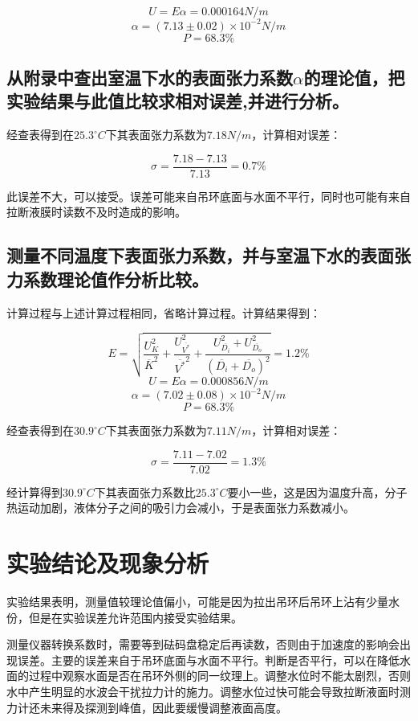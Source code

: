 \documentclass{ctexart}
\begin{document}
$$ U = E \alpha = 0.000164 N/m $$
$$ \alpha = (7.13 \pm 0.02) \times 10^{-2} N/m $$
$$ P = 68.3 \% $$



\subsection{从附录中查出室温下水的表面张力系数$\alpha$的理论值，把实验结果与此值比较求相对误差,并进行分析。}

经查表得到在$25.3^\circ C$下其表面张力系数为$7.18 N/m$，计算相对误差：

$$ \sigma = \frac{7.18-7.13}{7.13} = 0.7\% $$

此误差不大，可以接受。误差可能来自吊环底面与水面不平行，同时也可能有来自拉断液膜时读数不及时造成的影响。

\subsection{测量不同温度下表面张力系数，并与室温下水的表面张力系数理论值作分析比较。}

计算过程与上述计算过程相同，省略计算过程。计算结果得到：

$$ E = \sqrt{\frac{U_K^2}{\overline{K}^2} + \frac{U_{\overline{V^\ast}}^2}{\overline{V^\ast}^2} + \frac{U_{\overline{D_i}}^2 + U_{\overline{D_o}}^2}{\left(\overline{D_i}+\overline{D_o}\right)^2}} = 1.2\% $$
$$ U = E \alpha = 0.000856 N/m $$
$$ \alpha = (7.02 \pm 0.08) \times 10^{-2} N/m $$
$$ P = 68.3 \% $$

经查表得到在$30.9^\circ C$下其表面张力系数为$7.11 N/m$，计算相对误差：

$$ \sigma = \frac{7.11-7.02}{7.02} = 1.3\% $$

经计算得到$30.9^\circ C$下其表面张力系数比$25.3^\circ C$要小一些，这是因为温度升高，分子热运动加剧，液体分子之间的吸引力会减小，于是表面张力系数减小。

\section{实验结论及现象分析}
实验结果表明，测量值较理论值偏小，可能是因为拉出吊环后吊环上沾有少量水份，但是在实验误差允许范围内接受实验结果。

测量仪器转换系数时，需要等到砝码盘稳定后再读数，否则由于加速度的影响会出现误差。主要的误差来自于吊环底面与水面不平行。判断是否平行，可以在降低水面的过程中观察水面是否在吊环外侧的同一纹理上。调整水位时不能太剧烈，否则水中产生明显的水波会干扰拉力计的施力。调整水位过快可能会导致拉断液面时测力计还未来得及探测到峰值，因此要缓慢调整液面高度。
\end{document}
